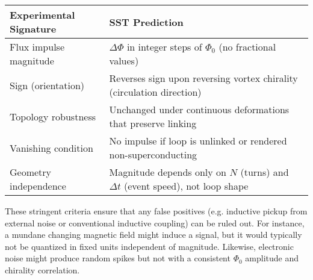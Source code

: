 \documentclass[12pt]{article}
\begin{document}
        \begin{center}
        \begin{tabular}{ll}
        \hline
        \textbf{Experimental Signature} & \textbf{SST Prediction} \\
        \hline
        Flux impulse magnitude & $\Delta\Phi$ in integer steps of $\Phi_{0}$ (no fractional values)\\
        Sign (orientation) & Reverses sign upon reversing vortex chirality (circulation direction)\\
        Topology robustness & Unchanged under continuous deformations that preserve linking\\
        Vanishing condition & No impulse if loop is unlinked or rendered non-superconducting\\
        Geometry independence & Magnitude depends only on $N$ (turns) and $\Delta t$ (event speed), not loop shape\\
        \hline
        \end{tabular}
        \label{tab:criteria}
        \end{center}

        These stringent criteria ensure that any false positives (e.g. inductive pickup from external noise or conventional inductive coupling) can be ruled out. For instance, a mundane changing magnetic field might induce a signal, but it would typically not be quantized in fixed units independent of magnitude. Likewise, electronic noise might produce random spikes but not with a consistent $\Phi_{0}$ amplitude and chirality correlation.
\end{document}
